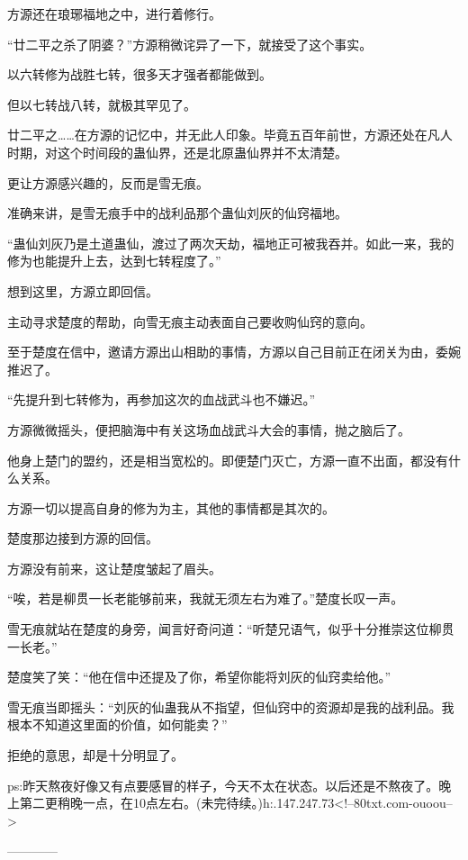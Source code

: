 \begin{this_body}
方源还在琅琊福地之中，进行着修行。

“廿二平之杀了阴婆？”方源稍微诧异了一下，就接受了这个事实。

以六转修为战胜七转，很多天才强者都能做到。

但以七转战八转，就极其罕见了。

廿二平之……在方源的记忆中，并无此人印象。毕竟五百年前世，方源还处在凡人时期，对这个时间段的蛊仙界，还是北原蛊仙界并不太清楚。

更让方源感兴趣的，反而是雪无痕。

准确来讲，是雪无痕手中的战利品那个蛊仙刘灰的仙窍福地。

“蛊仙刘灰乃是土道蛊仙，渡过了两次天劫，福地正可被我吞并。如此一来，我的修为也能提升上去，达到七转程度了。”

想到这里，方源立即回信。

主动寻求楚度的帮助，向雪无痕主动表面自己要收购仙窍的意向。

至于楚度在信中，邀请方源出山相助的事情，方源以自己目前正在闭关为由，委婉推迟了。

“先提升到七转修为，再参加这次的血战武斗也不嫌迟。”

方源微微摇头，便把脑海中有关这场血战武斗大会的事情，抛之脑后了。

他身上楚门的盟约，还是相当宽松的。即便楚门灭亡，方源一直不出面，都没有什么关系。

方源一切以提高自身的修为为主，其他的事情都是其次的。

楚度那边接到方源的回信。

方源没有前来，这让楚度皱起了眉头。

“唉，若是柳贯一长老能够前来，我就无须左右为难了。”楚度长叹一声。

雪无痕就站在楚度的身旁，闻言好奇问道：“听楚兄语气，似乎十分推崇这位柳贯一长老。”

楚度笑了笑：“他在信中还提及了你，希望你能将刘灰的仙窍卖给他。”

雪无痕当即摇头：“刘灰的仙蛊我从不指望，但仙窍中的资源却是我的战利品。我根本不知道这里面的价值，如何能卖？”

拒绝的意思，却是十分明显了。

ps:昨天熬夜好像又有点要感冒的样子，今天不太在状态。以后还是不熬夜了。晚上第二更稍晚一点，在10点左右。(未完待续。)h:.147.247.73<!--80txt.com-ouoou-->

------------

\end{this_body}

